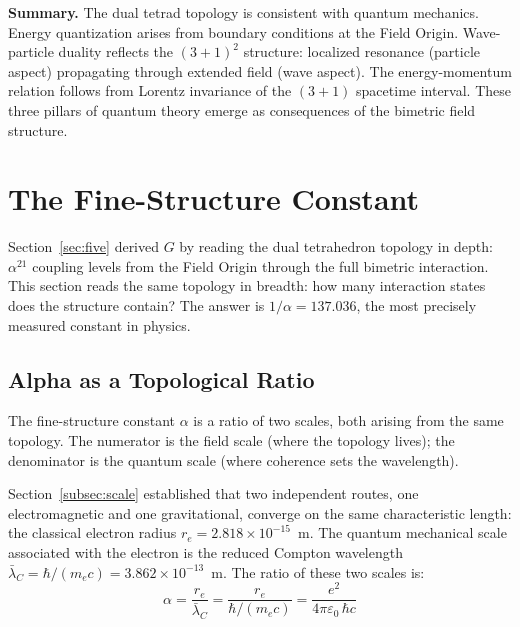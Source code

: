 \documentclass[aps,prd,preprint,superscriptaddress,showpacs,preprintnumbers,amsmath,amssymb,nofootinbib]{revtex4-2}
\begin{document}
\textbf{Summary.}
The dual tetrad topology is consistent with quantum mechanics. Energy quantization arises from boundary conditions at the Field Origin. Wave-particle duality reflects the $(3+1)^2$ structure: localized resonance (particle aspect) propagating through extended field (wave aspect). The energy-momentum relation follows from Lorentz invariance of the $(3+1)$ spacetime interval. These three pillars of quantum theory emerge as consequences of the bimetric field structure.

\section{The Fine-Structure Constant}
\label{sec:alpha}

Section~\ref{sec:five} derived $G$ by reading the dual tetrahedron topology in depth: $\alpha^{21}$ coupling levels from the Field Origin through the full bimetric interaction. This section reads the same topology in breadth: how many interaction states does the structure contain? The answer is $1/\alpha = 137.036$, the most precisely measured constant in physics.

\subsection{Alpha as a Topological Ratio}
\label{subsec:alpha-scale}

The fine-structure constant $\alpha$ is a ratio of two scales, both arising from the same topology. The numerator is the field scale (where the topology lives); the denominator is the quantum scale (where coherence sets the wavelength).

Section~\ref{subsec:scale} established that two independent routes, one electromagnetic and one gravitational, converge on the same characteristic length: the classical electron radius $r_e = 2.818 \times 10^{-15}$~m. The quantum mechanical scale associated with the electron is the reduced Compton wavelength $\bar{\lambda}_C = \hbar/(m_e c) = 3.862 \times 10^{-13}$~m. The ratio of these two scales is:
\begin{equation}
\alpha = \frac{r_e}{\bar{\lambda}_C} = \frac{r_e}{\hbar/(m_e c)} = \frac{e^2}{4\pi\varepsilon_0\,\hbar c}
\label{eq:alpha-ratio}
\end{equation}
\end{document}
